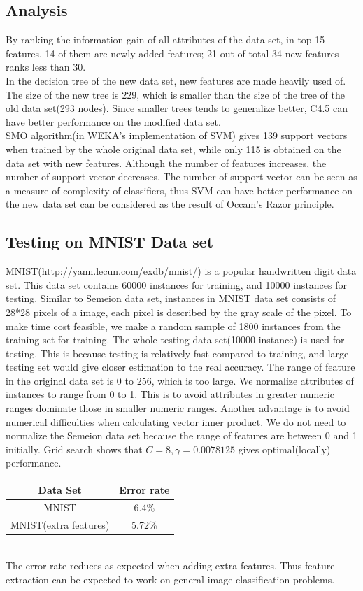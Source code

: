 \documentclass[a4paper,11pt]{article}
\begin{document}
\subsection{Analysis}
By ranking the information gain of all attributes of the data set, in top 15 features, 14 of them are newly added features; 21 out of total 34 new features ranks less than 30. \\
In the decision tree of the new data set, new features are made heavily used of. The size of the new tree is 229, which is smaller than the size of the tree of the old data set(293 nodes). Since smaller trees tends to generalize better, C4.5 can have better performance on the modified data set.\\
SMO algorithm(in WEKA's implementation of SVM) gives 139 support vectors when trained by the whole original data set, while only 115 is obtained on the data set with new features. Although the number of features increases, the number of support vector decreases. The number of support vector can be seen as a measure of complexity of classifiers, thus SVM can have better performance on the new data set can be considered as the result of Occam's Razor principle.\\
\subsection{Testing on MNIST Data set}
MNIST(\url{http://yann.lecun.com/exdb/mnist/}) is a popular handwritten digit data set. This data set contains 60000 instances for training, and 10000 instances for testing.  Similar to Semeion data set, instances in MNIST data set consists of 28*28 pixels of a image, each pixel is described by the gray scale of the pixel. To make time cost feasible, we make a random sample of 1800 instances from the training set for training. The whole testing data set(10000 instance) is used for testing. This is because testing is relatively fast compared to training, and large testing set would give closer estimation to the real accuracy. The range of feature in the original data set is 0 to 256, which is too large. We normalize attributes of instances to range from 0 to 1. This is to avoid attributes in greater numeric ranges dominate those in smaller numeric ranges. Another advantage is to avoid numerical difficulties when calculating vector inner product\cite{svm}. We do not need to normalize the Semeion data set because the range of features are between 0 and 1 initially. Grid search shows that $C=8, \gamma=0.0078125$ gives optimal(locally) performance.\\
\vspace{0.5cm}
\begin{tabular}{c c}
Data Set	& Error rate\\
\hline \hline
MNIST	                  & 6.4\%\\
MNIST(extra features)	  & 5.72\%\\
\end{tabular}
\vspace{0.5cm}\\
The error rate reduces as expected when adding extra features. Thus feature extraction can be expected to work on general image classification problems.
\end{document}
